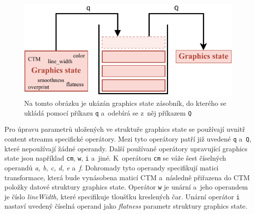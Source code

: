 \begin{figure}[H]
    \centering
    \includegraphics[width=0.7\linewidth]{obrazky-figures/graphics_state_stack.pdf}
    \caption{
        Na tomto obrázku je ukázán graphics state zásobník, do kterého se ukládá
        pomocí příkazu \texttt{q} a~odebírá se z~něj příkazem \texttt{Q}
    }
    \label{pic_graphics_state}
\end{figure}

Pro úpravu parametrů uložených ve struktuře graphics state se používají uvnitř
content streamu specifické operátory. Mezi tyto operátory patří již uvedené
\texttt{q} a~\texttt{Q}, které nepoužívají žádné operandy. Další používané
operátory upravující graphics state jsou například \texttt{cm}, \texttt{w},
\texttt{i} a~jiné. K~operátoru \texttt{cm} se váže šest číselných operandů
\emph{a, b, c, d, e} a~\emph{f}. Dohromady tyto operandy specifikují matici
transformace, která bude vynásobena maticí CTM a~následně přiřazena do CTM položky
datové struktury graphics state. Operátor \texttt{w} je unární a~jeho operandem
je číslo \emph{lineWidth}, které specifikuje tloušťku kreslených čar. Unární
operátor \texttt{i} nastaví uvedený číselná operand jako \emph{flatness} parametr
struktury graphics state.



